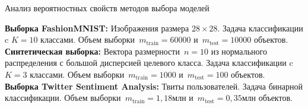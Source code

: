 \documentclass[10pt,pdf,hyperref={unicode}]{beamer}
\begin{document}
\begin{frame}{Анализ вероятностных свойств методов выбора моделей}
\justifying

\textbf{Выборка FashionMNIST:} Изображения размера $28\times 28$. Задача классификации c $K=10$ классами. Объем выборки~$m_{\text{train}}=60000$ и~$m_{\text{test}}=10000$ объектов.\\[1mm]
\textbf{Синтетическая выборка:} Вектора размерности~$n=10$ из нормального распределения с большой дисперсией целевого класса. Задача классификации c $K=3$ классами. Объем выборки~$m_{\text{train}}=1000$ и~$m_{\text{test}}=100$ объектов.\\[1mm]
\textbf{Выборка Twitter Sentiment Analysis:} Твиты пользователей. Задача бинарной классификации. Объем выборки~$m_{\text{train}}=1{,}18$млн и~$m_{\text{test}}=0{,}35$млн объектов.
\begin{table}[]
\begin{center}
\end{center}
\end{table}
\end{frame}
\end{document}
